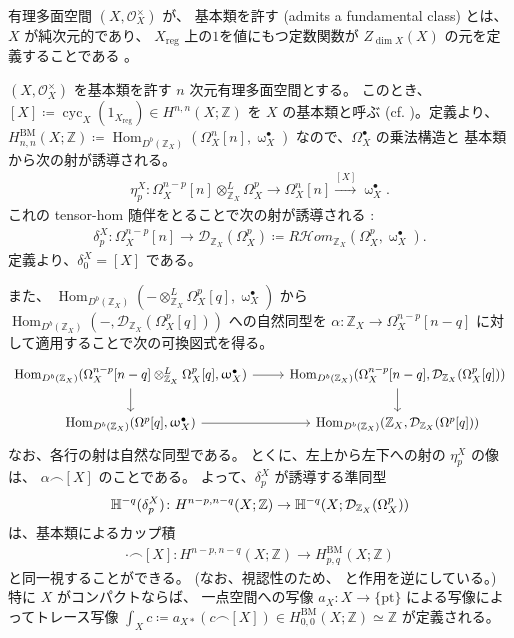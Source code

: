 \documentclass[a4paper,dvipdfmx,reqno,12pt]{amsart}
\theoremstyle{definition}
\newcommand{\deq}{\coloneqq}
\newcommand{\opn}[1]{\operatorname{#1}}
\newcommand{\xto}[1]{\xrightarrow{#1}}
\numberwithin{equation}{section}
\begin{document}
有理多面空間
$(X,\mathcal{O}_X^{\times})$ が、
基本類を許す
(admits a fundamental class)
とは、$X$ が純次元的であり、
$X_{\opn{reg}}$ 
上の$1$を値にもつ定数関数が
$Z_{\dim X}(X)$ の元を定義することである
\cite[]{MR4637248}。



$(X,\mathcal{O}_X^{\times})$ 
を基本類を許す $n$ 次元有理多面空間とする。
このとき、$[X]\deq \opn{cyc}_X(1_{X_{\opn{reg}}})
\in H^{n,n}(X;\mathbb{Z})$ を $X$ の基本類と呼ぶ
(cf. \cite[Definition 4.8]{MR3894860})。定義より、
$H_{n,n}^{\mathrm{BM}}
(X;\mathbb{Z})\deq \opn{Hom}_{D^{b}(\mathbb{Z}_X)}
(\Omega_{X}^{n}[n],\upomega_{X}^{\bullet})$
なので、$\Omega_X^{\bullet}$ の乗法構造と
基本類から次の射が誘導される。
\begin{align}
\eta_{p}^{X}\colon \Omega_X^{n-p}[n]\otimes^{L}_{\mathbb{Z}_X}
\Omega_X^{p} \to \Omega_X^{n}[n] \xto{[X]}
\upomega_X^{\bullet}. 	
\end{align}
これの tensor-hom 随伴をとることで次の射が誘導される
\cite[p.627]{MR4637248}:
\begin{align}
\delta_p^{X}\colon \Omega_X^{n-p}[n]\to 
\mathcal{D}_{\mathbb{Z}_X}(\Omega_X^{p})
\deq R\mathcal{H}om_{\mathbb{Z}_X}(\Omega_X^{p},
\upomega_X^{\bullet}).
\end{align}
定義より、$\delta_0^{X}=[X]$ である。

また、
$\opn{Hom}_{D^{b}(\mathbb{Z}_X)}(- 
\otimes^{L}_{\mathbb{Z}_X} \Omega_X^{p}[q],
\upomega_X^{\bullet})$ から
$\opn{Hom}_{D^{b}(\mathbb{Z}_X)}(-,
\mathcal{D}_{\mathbb{Z}_X}(\Omega_X^{p}[q]))$
への自然同型を
$\alpha \colon \mathbb{Z}_X\to \Omega_X^{n-p}[n-q]$
に対して適用することで次の可換図式を得る。
\[\begin{tikzcd}
{\opn{Hom}_{D^{b}(\mathbb{Z}_X)}(\Omega_X^{n-p}[n-q]
\otimes^{L}_{\mathbb{Z}_X} \Omega_X^{p}[q]
,\upomega_X^{\bullet})} & 
{\opn{Hom}_{D^{b}(\mathbb{Z}_X)}
(\Omega_X^{n-p}[n-q],\mathcal{D}_{\mathbb{Z}_X}(\Omega_X^{p}[q]))} \\
{\opn{Hom}_{D^{b}(\mathbb{Z}_X)}(\Omega^{p}[q],
\upomega_X^{\bullet})} & {\opn{Hom}_{D^{b}(\mathbb{Z}_X)}(\mathbb{Z}_X,\mathcal{D}_{\mathbb{Z}_X}(\Omega^{p}[q]))}
	\arrow[from=1-2, to=2-2]
	\arrow[from=2-1, to=2-2]
	\arrow[from=1-1, to=1-2]
	\arrow[from=1-1, to=2-1]
\end{tikzcd}\]
なお、各行の射は自然な同型である。
とくに、左上から左下への射の $\eta^X_{p}$ の像は、
$\alpha\frown [X]$ のことである。
よって、$\delta_p^{X}$ が誘導する準同型
\begin{align}
\mathbb{H}^{-q}(\delta_p^{X})
\colon H^{n-p,n-q}(X;\mathbb{Z})
\to \mathbb{H}^{-q}(X;\mathcal{D}_{\mathbb{Z}_X}
(\Omega_X^{p})) \notag
\end{align}
は、基本類によるカップ積
\cite[]{MR4246795}
\begin{align}
\label{equation-PD-map}
\cdot \frown [X]
\colon H^{n-p,n-q}(X;\mathbb{Z})
\to
H^{\mathrm{BM}}_{p,q}(X;\mathbb{Z})
\end{align}
と同一視することができる。
(なお、視認性のため、\cite[]{MR4246795}
と作用を逆にしている。)
特に $X$ がコンパクトならば、
一点空間への写像
$a_X\colon X\to \{\mathrm{pt}\}$
による写像によってトレース写像
$\int_X c\deq a_{X*}(c\frown [X])\in 
H_{0,0}^{\mathrm{BM}}(X;\mathbb{Z})\simeq \mathbb{Z}$
が定義される。
\end{document}
